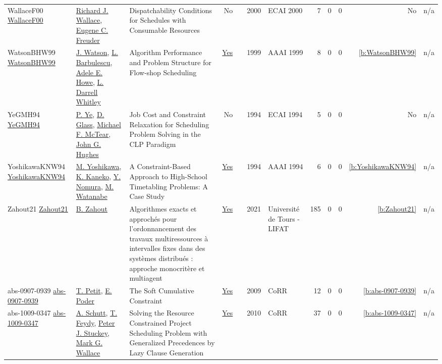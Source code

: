 {\begin{longtable}{>{\raggedright\arraybackslash}p{3cm}>{\raggedright\arraybackslash}p{6cm}>{\raggedright\arraybackslash}p{6.5cm}rrrp{2.5cm}rrrrr}
WallaceF00 \href{}{WallaceF00} & \hyperref[auth:a1292]{Richard J. Wallace}, \hyperref[auth:a275]{Eugene C. Freuder} & Dispatchability Conditions for Schedules with Consumable Resources & No & \cite{WallaceF00} & 2000 & ECAI 2000 & 7 & 0 & 0 & No & n/a\\
WatsonBHW99 \href{http://www.aaai.org/Library/AAAI/1999/aaai99-098.php}{WatsonBHW99} & \hyperref[auth:a363]{J. Watson}, \hyperref[auth:a1338]{L. Barbulescu}, \hyperref[auth:a1339]{Adele E. Howe}, \hyperref[auth:a1340]{L. Darrell Whitley} & Algorithm Performance and Problem Structure for Flow-shop Scheduling & \href{../works/WatsonBHW99.pdf}{Yes} & \cite{WatsonBHW99} & 1999 & AAAI 1999 & 8 & 0 & 0 & \ref{b:WatsonBHW99} & n/a\\
YeGMH94 \href{}{YeGMH94} & \hyperref[auth:a1280]{P. Ye}, \hyperref[auth:a1281]{D. Glass}, \hyperref[auth:a1282]{Michael F. McTear}, \hyperref[auth:a1283]{John G. Hughes} & Job Cost and Constraint Relaxation for Scheduling Problem Solving in the {CLP} Paradigm & No & \cite{YeGMH94} & 1994 & ECAI 1994 & 5 & 0 & 0 & No & n/a\\
YoshikawaKNW94 \href{http://www.aaai.org/Library/AAAI/1994/aaai94-171.php}{YoshikawaKNW94} & \hyperref[auth:a1303]{M. Yoshikawa}, \hyperref[auth:a1304]{K. Kaneko}, \hyperref[auth:a1305]{Y. Nomura}, \hyperref[auth:a1306]{M. Watanabe} & A Constraint-Based Approach to High-School Timetabling Problems: {A} Case Study & \href{../works/YoshikawaKNW94.pdf}{Yes} & \cite{YoshikawaKNW94} & 1994 & AAAI 1994 & 6 & 0 & 0 & \ref{b:YoshikawaKNW94} & n/a\\
Zahout21 \href{https://hal.science/tel-03606639}{Zahout21} & \hyperref[auth:a896]{B. Zahout} & {Algorithmes exacts et approch{\'e}s pour l'ordonnancement des travaux multiressources {\`a} intervalles fixes dans des syst{\`e}mes distribu{\'e}s : approche monocrit{\`e}re et multiagent} & \href{../works/Zahout21.pdf}{Yes} & \cite{Zahout21} & 2021 & {Universit{\'e} de Tours - LIFAT} & 185 & 0 & 0 & \ref{b:Zahout21} & n/a\\
abs-0907-0939 \href{http://arxiv.org/abs/0907.0939}{abs-0907-0939} & \hyperref[auth:a226]{T. Petit}, \hyperref[auth:a361]{E. Poder} & The Soft Cumulative Constraint & \href{../works/abs-0907-0939.pdf}{Yes} & \cite{abs-0907-0939} & 2009 & CoRR & 12 & 0 & 0 & \ref{b:abs-0907-0939} & n/a\\
abs-1009-0347 \href{http://arxiv.org/abs/1009.0347}{abs-1009-0347} & \hyperref[auth:a125]{A. Schutt}, \hyperref[auth:a155]{T. Feydy}, \hyperref[auth:a126]{Peter J. Stuckey}, \hyperref[auth:a117]{Mark G. Wallace} & Solving the Resource Constrained Project Scheduling Problem with Generalized Precedences by Lazy Clause Generation & \href{../works/abs-1009-0347.pdf}{Yes} & \cite{abs-1009-0347} & 2010 & CoRR & 37 & 0 & 0 & \ref{b:abs-1009-0347} & n/a\\

\end{longtable}}

